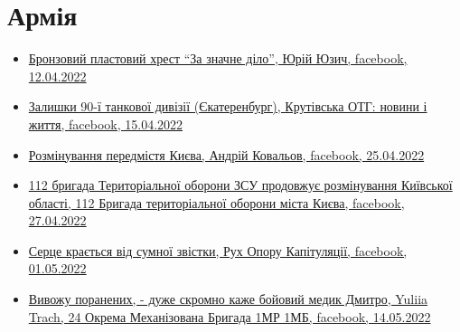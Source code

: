  
 
 
 
 
\section{Армія}
\label{sec:topics.vojna.armia}






\begin{itemize} %

\item \hyperlink{12_04_2022.fb.juzych_jurij.1.plast_krest_nagrada}{%
Бронзовий пластовий хрест \enquote{За значне діло}, Юрій Юзич, facebook, 12.04.2022%
}



\item \hyperlink{15_04_2022.fb.krutivska_otg.1.zalyshky_divizii_ekaterinburg}{%
Залишки 90-ї танкової дивізії (Єкатеренбург), Крутівська ОТГ: новини і життя, %
facebook, 15.04.2022%
}

\item \hyperlink{25_04_2022.fb.kovalov_andrij.1.razminirovanie_predmestij_kieva}{%
Розмінування передмістя Києва, Андрій Ковальов, facebook, 25.04.2022%
}

\item \hyperlink{27_04_2022.fb.teroborona_ua.kiev.112.br.1.rozminuvannja_kiev_obl}{%
112 бригада Територіальної оборони ЗСУ продовжує розмінування Київської області, %
112 Бригада територіальної оборони міста Києва, facebook, 27.04.2022%
}

\item \hyperlink{01_05_2022.fb.fb_group.ruh_oporu_kapituljacii.1.smert_ruslan_borovik}{%
Серце крається від сумної звістки, Рух Опору Капітуляції, facebook, 01.05.2022%
}

\item \hyperlink{14_05_2022.fb.fb_group.ua.armia.24_ombr.1mp.1mb.1.medik}{%
Вивожу поранених, - дуже скромно каже бойовий медик Дмитро, Yuliia Trach, 24 Окрема Механізована Бригада 1МР 1МБ, %
facebook, 14.05.2022%
}

\end{itemize} %
